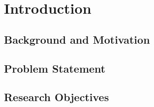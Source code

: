 \chapter{Introduction} \label{chap:chap-1}





\section{Background and Motivation}





\section{Problem Statement}

\section{Research Objectives}